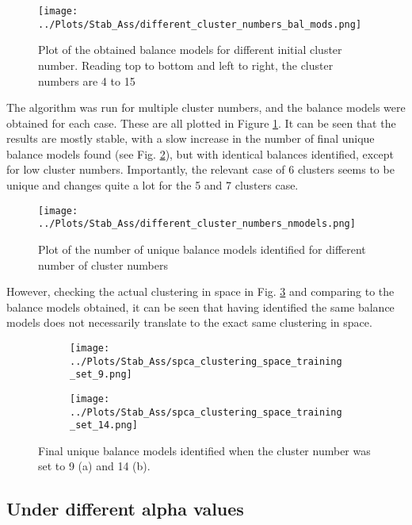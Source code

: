 \documentclass[12pt]{report} %
\begin{document}
\begin{figure}[htbp]
  \centering
  \texttt{[image: ../Plots/Stab\_Ass/different\_cluster\_numbers\_bal\_mods.png]}
  \caption{Plot of the obtained balance models for different initial cluster number. Reading top to bottom and left to right, the cluster numbers are 4 to 15}
  \label{fig:diff_clust_num_bal_mods}
\end{figure}

The algorithm was run for multiple cluster numbers, and the balance models were obtained for each case. These are all plotted in Figure \ref{fig:diff_clust_num_bal_mods}. It can be seen that the results are mostly stable, with a slow increase in the number of final unique balance models found (see Fig. \ref{fig:diff_clust_num_nmodels}), but with identical balances identified, except for low cluster numbers. Importantly, the relevant case of 6 clusters seems to be unique and changes quite a lot for the 5 and 7 clusters case.

\begin{figure}[htbp]
  \centering
  \texttt{[image: ../Plots/Stab\_Ass/different\_cluster\_numbers\_nmodels.png]}
  \caption{Plot of the number of unique balance models identified for different number of cluster numbers}
  \label{fig:diff_clust_num_nmodels}
\end{figure}

However, checking the actual clustering in space in Fig. \ref{fig:diif_clust_num_clustering} and comparing to the balance models obtained, it can be seen that having identified the same balance models does not necessarily translate to the exact same clustering in space.


\begin{figure}[htbp]
  \centering
  \begin{subfigure}[b]{0.7\textwidth}
      \texttt{[image: ../Plots/Stab\_Ass/spca\_clustering\_space\_training\_set\_9.png]}
      \caption{}
  \end{subfigure}
  \begin{subfigure}[b]{0.7\textwidth}
      \texttt{[image: ../Plots/Stab\_Ass/spca\_clustering\_space\_training\_set\_14.png]}
      \caption{}
  \end{subfigure}
  \caption{Final unique balance models identified when the cluster number was set to 9 (a) and 14 (b).}
  \label{fig:diif_clust_num_clustering}
\end{figure}

\subsection{Under different alpha values}
\end{document}
